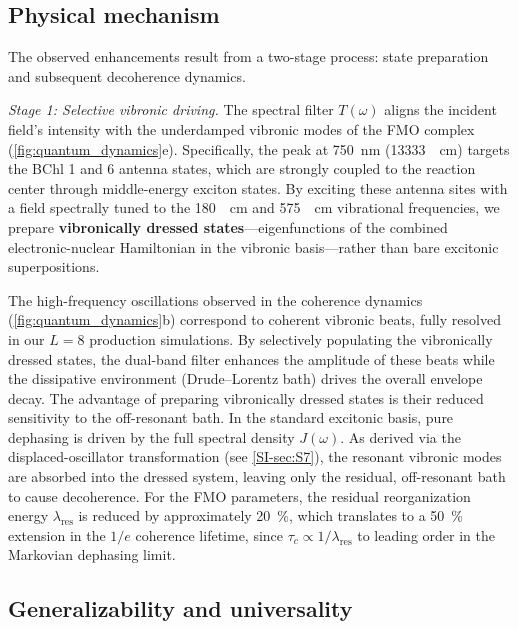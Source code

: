 \documentclass[journal=jpcl,manuscript=letter]{achemso}
\begin{document}
\subsection*{Physical mechanism}

The observed enhancements result from a two-stage process: state preparation and subsequent decoherence dynamics. 

\textit{Stage 1: Selective vibronic driving.} The spectral filter $T(\omega)$ aligns the incident field's intensity with the underdamped vibronic modes of the FMO complex (\cref{fig:quantum_dynamics}e). Specifically, the peak at \SI{750}{\nano\meter} (\SI{13333}{\per\centi\meter}) targets the BChl 1 and 6 antenna states, which are strongly coupled to the reaction center through middle-energy exciton states. By exciting these antenna sites with a field spectrally tuned to the \SI{180}{\per\centi\meter} and \SI{575}{\per\centi\meter} vibrational frequencies, we prepare \textbf{vibronically dressed states}---eigenfunctions of the combined electronic-nuclear Hamiltonian in the vibronic basis\cite{Womick2015,Sanda2022}---rather than bare excitonic superpositions.

The high-frequency oscillations observed in the coherence dynamics (\cref{fig:quantum_dynamics}b) correspond to coherent vibronic beats, fully resolved in our $L=8$ production simulations. By selectively populating the vibronically dressed states, the dual-band filter enhances the amplitude of these beats while the dissipative environment (Drude--Lorentz bath) drives the overall envelope decay. The advantage of preparing vibronically dressed states is their reduced sensitivity to the off-resonant bath. In the standard excitonic basis, pure dephasing is driven by the full spectral density $J(\omega)$. As derived via the displaced-oscillator transformation (see \cref{SI-sec:S7}), the resonant vibronic modes are absorbed into the dressed system, leaving only the residual, off-resonant bath to cause decoherence. For the FMO parameters, the residual reorganization energy $\lambda_{\mathrm{res}}$ is reduced by approximately \SI{20}{\percent}, which translates to a \SI{50}{\percent} extension in the $1/e$ coherence lifetime, since $\tau_c \propto 1/\lambda_{\mathrm{res}}$ to leading order in the Markovian dephasing limit.

\subsection*{Generalizability and universality}
\end{document}
